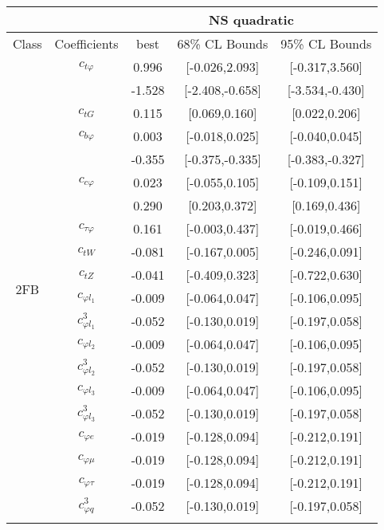 \documentclass{article}
\begin{document}
\begin{table}[H]
\centering
\begin{tabular}{|c|c|c|c|c|}
\hline
 &  & \multicolumn{3}{c|}{NS quadratic}  \\ \hline
Class & Coefficients & best & 68\% CL Bounds & 95\% CL Bounds\\ \hline
\multirow{23}{*}{2FB}
 & $c_{t \varphi}$ & 0.996 & [-0.026,2.093] & [-0.317,3.560]  \\ \cline{3-5} & & -1.528 & [-2.408,-0.658] & [-3.534,-0.430]  \\ \cline{2-5}
 & $c_{tG}$ & 0.115 & [0.069,0.160] & [0.022,0.206]  \\ \cline{2-5}
 & $c_{b \varphi}$ & 0.003 & [-0.018,0.025] & [-0.040,0.045]  \\ \cline{3-5} & & -0.355 & [-0.375,-0.335] & [-0.383,-0.327]  \\ \cline{2-5}
 & $c_{c \varphi}$ & 0.023 & [-0.055,0.105] & [-0.109,0.151]  \\ \cline{3-5} & & 0.290 & [0.203,0.372] & [0.169,0.436]  \\ \cline{2-5}
 & $c_{\tau \varphi}$ & 0.161 & [-0.003,0.437] & [-0.019,0.466]  \\ \cline{2-5}
 & $c_{tW}$ & -0.081 & [-0.167,0.005] & [-0.246,0.091]  \\ \cline{2-5}
 & $c_{tZ}$ & -0.041 & [-0.409,0.323] & [-0.722,0.630]  \\ \cline{2-5}
 & $c_{\varphi l_1}$ & -0.009 & [-0.064,0.047] & [-0.106,0.095]  \\ \cline{2-5}
 & $c_{\varphi l_1}^{3}$ & -0.052 & [-0.130,0.019] & [-0.197,0.058]  \\ \cline{2-5}
 & $c_{\varphi l_2}$ & -0.009 & [-0.064,0.047] & [-0.106,0.095]  \\ \cline{2-5}
 & $c_{\varphi l_2}^{3}$ & -0.052 & [-0.130,0.019] & [-0.197,0.058]  \\ \cline{2-5}
 & $c_{\varphi l_3}$ & -0.009 & [-0.064,0.047] & [-0.106,0.095]  \\ \cline{2-5}
 & $c_{\varphi l_3}^{3}$ & -0.052 & [-0.130,0.019] & [-0.197,0.058]  \\ \cline{2-5}
 & $c_{\varphi e}$ & -0.019 & [-0.128,0.094] & [-0.212,0.191]  \\ \cline{2-5}
 & $c_{\varphi \mu}$ & -0.019 & [-0.128,0.094] & [-0.212,0.191]  \\ \cline{2-5}
 & $c_{\varphi \tau}$ & -0.019 & [-0.128,0.094] & [-0.212,0.191]  \\ \cline{2-5}
 & $c_{\varphi q}^{3}$ & -0.052 & [-0.130,0.019] & [-0.197,0.058]  \\ \cline{2-5}

\end{tabular}
\end{table}
\end{document}
